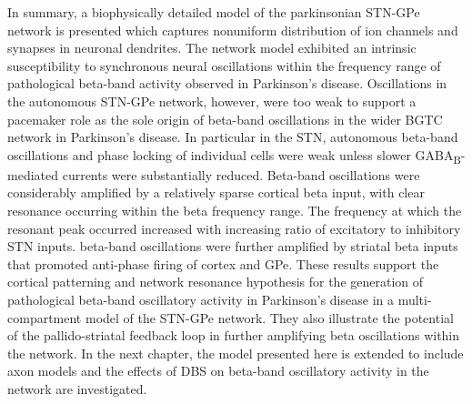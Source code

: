 In summary, a biophysically detailed model of the parkinsonian STN-GPe network is presented which captures nonuniform distribution of ion channels and synapses in neuronal dendrites. The network model exhibited an intrinsic susceptibility to synchronous neural oscillations within the frequency range of pathological beta-band activity observed in Parkinson's disease. Oscillations in the autonomous STN-GPe network, however, were too weak to support a pacemaker role as the sole origin of beta-band oscillations in the wider BGTC network in Parkinson's disease. In particular in the STN, autonomous beta-band oscillations and phase locking of individual cells were weak unless slower GABA\textsubscript{B}-mediated currents were substantially reduced. Beta-band oscillations were considerably amplified by a relatively sparse cortical beta input, with clear resonance occurring within the beta frequency range. The frequency at which the resonant peak occurred increased with increasing ratio of excitatory to inhibitory STN inputs. beta-band oscillations were further amplified by striatal beta inputs that promoted anti-phase firing of cortex and GPe. These results support the cortical patterning and network resonance hypothesis for the generation of pathological beta-band oscillatory activity in Parkinson's disease in a multi-compartment model of the STN-GPe network. They also illustrate the potential of the pallido-striatal feedback loop in further amplifying beta oscillations within the network.
%
In the next chapter, the model presented here is extended to include axon models and the
effects of DBS on beta-band oscillatory activity in the network are investigated.
